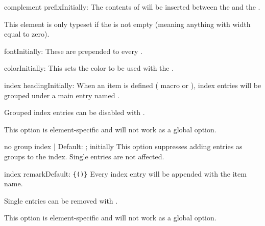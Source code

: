 \documentclass[11pt]{article}
\begin{document}
\begin{Optiondef}{complement prefix}{}{Initially: }
    The contents of  will be inserted between the  and the .

    This element is only typeset if the  is not empty (meaning anything with width equal to zero).
\end{Optiondef}

\begin{Optiondef}{font}{}{Initially: }
    These  are prepended to every .
\end{Optiondef}

\begin{Optiondef}{color}{}{Initially: }
    This sets the color to be used with the .
\end{Optiondef}

\begin{Optiondef}{index heading}{}{Initially: }
    When an item is defined ( macro or \hyperref[environmentdef]{}), index entries will be grouped under a main entry named .

    Grouped index entries can be disabled with .

    This option is element-specific and will not work as a global option.
\end{Optiondef}

\begin{Optiondef}{no group index}{ | }{Default: ; initially }
    This option suppresses adding entries as groups to the index. Single entries are not affected.
\end{Optiondef}

\begin{Optiondef}{index remark}{}{Default: \texttt{\{\PDTilde()\}}}
    Every index entry will be appended with  the item name.

    Single entries can be removed with .

    This option is element-specific and will not work as a global option.
\end{Optiondef}
\end{document}
